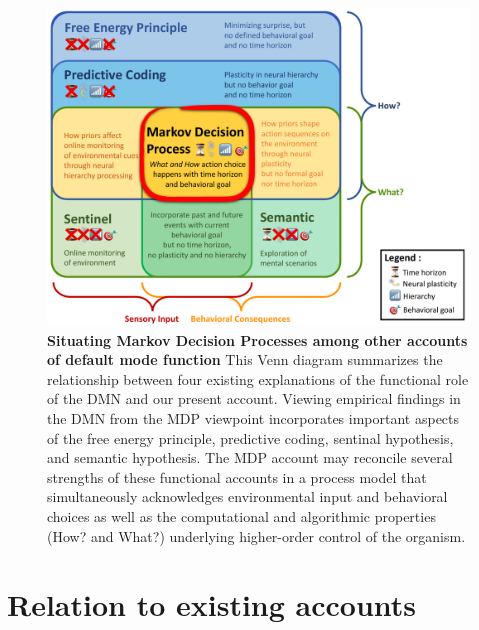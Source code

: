 \documentclass[10pt,letterpaper]{article}
\begin{document}
\begin{figure}[!h]
  \includegraphics[width=1\linewidth]{VennDiagram-2017-09-08.pdf}
  \caption{\textbf{Situating Markov Decision Processes among other accounts of default mode function}
  This Venn diagram summarizes the relationship between four existing explanations of the functional role of the DMN and our present account. Viewing empirical findings in the DMN from the MDP viewpoint incorporates important aspects of the free energy principle, predictive coding, sentinal hypothesis, and semantic hypothesis.
  The MDP account may reconcile several strengths of these functional accounts in a process model that simultaneously acknowledges environmental input and behavioral choices as well as the computational and algorithmic properties (How? and What?) underlying higher-order control of the organism.}
  \label{fig:VennDiagram}
\end{figure}

\section{Relation to existing accounts}
\end{document}
